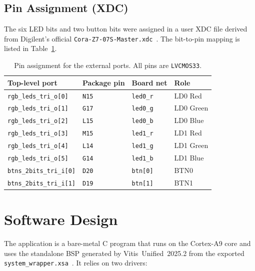 \documentclass[12pt]{article}
\begin{document}
\subsection{Pin Assignment (XDC)}
\label{sec:xdc}

The six LED bits and two button bits were assigned in a user XDC file
derived from Digilent's official
\texttt{Cora-Z7-07S-Master.xdc}~\cite{coraz7master}. The bit-to-pin
mapping is listed in Table~\ref{tab:xdc}.

\begin{table}[H]
\centering
\caption{Pin assignment for the external ports. All pins are
         \texttt{LVCMOS33}.}
\label{tab:xdc}
\begin{tabular}{@{}llll@{}}
\toprule
\textbf{Top-level port} & \textbf{Package pin} & \textbf{Board net} & \textbf{Role} \\
\midrule
\texttt{rgb\_leds\_tri\_o[0]}  & \texttt{N15} & \texttt{led0\_r} & LD0 Red   \\
\texttt{rgb\_leds\_tri\_o[1]}  & \texttt{G17} & \texttt{led0\_g} & LD0 Green \\
\texttt{rgb\_leds\_tri\_o[2]}  & \texttt{L15} & \texttt{led0\_b} & LD0 Blue  \\
\texttt{rgb\_leds\_tri\_o[3]}  & \texttt{M15} & \texttt{led1\_r} & LD1 Red   \\
\texttt{rgb\_leds\_tri\_o[4]}  & \texttt{L14} & \texttt{led1\_g} & LD1 Green \\
\texttt{rgb\_leds\_tri\_o[5]}  & \texttt{G14} & \texttt{led1\_b} & LD1 Blue  \\
\texttt{btns\_2bits\_tri\_i[0]} & \texttt{D20} & \texttt{btn[0]}  & BTN0 \\
\texttt{btns\_2bits\_tri\_i[1]} & \texttt{D19} & \texttt{btn[1]}  & BTN1 \\
\bottomrule
\end{tabular}
\end{table}

\section{Software Design}
\label{sec:sw}

The application is a bare-metal C program that runs on the
Cortex-A9 core and uses the standalone BSP generated by
Vitis~Unified~2025.2 from the exported
\texttt{system\_wrapper.xsa}~\cite{ug1400}. It relies on two drivers:
\end{document}
